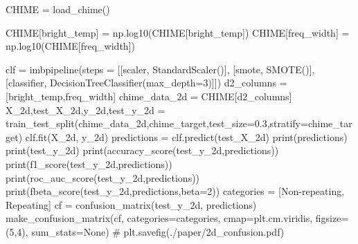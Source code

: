 \documentclass[
  letterpaper,
  DIV=11,
  numbers=noendperiod]{scrartcl}
\newenvironment{Shaded}{\begin{snugshade}}{\end{snugshade}}
\newcommand{\BuiltInTok}[1]{\textcolor[rgb]{0.00,0.23,0.31}{#1}}
\newcommand{\CommentTok}[1]{\textcolor[rgb]{0.37,0.37,0.37}{#1}}
\newcommand{\DecValTok}[1]{\textcolor[rgb]{0.68,0.00,0.00}{#1}}
\newcommand{\FloatTok}[1]{\textcolor[rgb]{0.68,0.00,0.00}{#1}}
\newcommand{\NormalTok}[1]{\textcolor[rgb]{0.00,0.23,0.31}{#1}}
\newcommand{\OperatorTok}[1]{\textcolor[rgb]{0.37,0.37,0.37}{#1}}
\newcommand{\StringTok}[1]{\textcolor[rgb]{0.13,0.47,0.30}{#1}}
\newcommand{\VariableTok}[1]{\textcolor[rgb]{0.07,0.07,0.07}{#1}}
\begin{document}
\begin{Shaded}
\begin{Highlighting}[]
\NormalTok{CHIME }\OperatorTok{=}\NormalTok{ load\_chime()}

\NormalTok{CHIME[}\StringTok{\textquotesingle{}bright\_temp\textquotesingle{}}\NormalTok{] }\OperatorTok{=}\NormalTok{ np.log10(CHIME[}\StringTok{\textquotesingle{}bright\_temp\textquotesingle{}}\NormalTok{])}
\NormalTok{CHIME[}\StringTok{\textquotesingle{}freq\_width\textquotesingle{}}\NormalTok{] }\OperatorTok{=}\NormalTok{ np.log10(CHIME[}\StringTok{\textquotesingle{}freq\_width\textquotesingle{}}\NormalTok{])}

\NormalTok{clf }\OperatorTok{=}\NormalTok{ imbpipeline(steps }\OperatorTok{=}\NormalTok{ [[}\StringTok{\textquotesingle{}scaler\textquotesingle{}}\NormalTok{, StandardScaler()],}
\NormalTok{                           [}\StringTok{\textquotesingle{}smote\textquotesingle{}}\NormalTok{, SMOTE()],}
\NormalTok{                           [}\StringTok{\textquotesingle{}classifier\textquotesingle{}}\NormalTok{, DecisionTreeClassifier(max\_depth}\OperatorTok{=}\DecValTok{3}\NormalTok{)]])}
\NormalTok{d2\_columns }\OperatorTok{=}\NormalTok{ [}\StringTok{\textquotesingle{}bright\_temp\textquotesingle{}}\NormalTok{,}\StringTok{\textquotesingle{}freq\_width\textquotesingle{}}\NormalTok{]}
\NormalTok{chime\_data\_2d }\OperatorTok{=}\NormalTok{ CHIME[d2\_columns]}
\NormalTok{X\_2d,test\_X\_2d,y\_2d,test\_y\_2d }\OperatorTok{=}\NormalTok{ train\_test\_split(chime\_data\_2d,chime\_target,test\_size}\OperatorTok{=}\FloatTok{0.3}\NormalTok{,stratify}\OperatorTok{=}\NormalTok{chime\_target)}
\NormalTok{clf.fit(X\_2d, y\_2d)}
\NormalTok{predictions }\OperatorTok{=}\NormalTok{ clf.predict(test\_X\_2d)}
\BuiltInTok{print}\NormalTok{(predictions)}
\BuiltInTok{print}\NormalTok{(test\_y\_2d)}
\BuiltInTok{print}\NormalTok{(accuracy\_score(test\_y\_2d,predictions))}
\BuiltInTok{print}\NormalTok{(f1\_score(test\_y\_2d,predictions))}
\BuiltInTok{print}\NormalTok{(roc\_auc\_score(test\_y\_2d,predictions))}
\BuiltInTok{print}\NormalTok{(fbeta\_score(test\_y\_2d,predictions,beta}\OperatorTok{=}\DecValTok{2}\NormalTok{))}
\NormalTok{categories }\OperatorTok{=}\NormalTok{ [}\StringTok{\textquotesingle{}Non{-}repeating\textquotesingle{}}\NormalTok{, }\StringTok{\textquotesingle{}Repeating\textquotesingle{}}\NormalTok{]}
\NormalTok{cf }\OperatorTok{=}\NormalTok{ confusion\_matrix(test\_y\_2d, predictions)}
\NormalTok{make\_confusion\_matrix(cf, }
\NormalTok{                      categories}\OperatorTok{=}\NormalTok{categories,}
\NormalTok{                      cmap}\OperatorTok{=}\NormalTok{plt.cm.viridis,}
\NormalTok{                      figsize}\OperatorTok{=}\NormalTok{(}\DecValTok{5}\NormalTok{,}\DecValTok{4}\NormalTok{),}
\NormalTok{                      sum\_stats}\OperatorTok{=}\VariableTok{None}\NormalTok{)}
\CommentTok{\# plt.savefig(\textquotesingle{}./paper/2d\_confusion.pdf\textquotesingle{})}


\end{Highlighting}
\end{Shaded}
\end{document}
